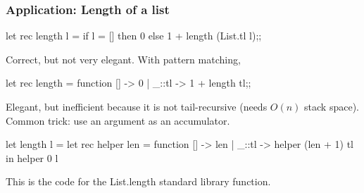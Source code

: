 \documentclass{plt}
\begin{document}
\begin{frame}[fragile]
  \frametitle{Application: Length of a list}

\begin{ocaml}
let rec length l =
  if l = [] then 0 else 1 + length (List.tl l);;
\end{ocaml}

Correct, but not very elegant.  With pattern matching,

\begin{ocaml}
let rec length = function
   []    -> 0
 | _::tl -> 1 + length tl;;
\end{ocaml}

Elegant, but inefficient because it is not tail-recursive (needs
$O(n)$ stack space).  Common trick: use an argument as an accumulator.

\begin{ocaml}
let length l =
  let rec helper len = function
      []    -> len
    | _::tl -> helper (len + 1) tl
  in helper 0 l
\end{ocaml}

This is the code for the List.length standard library function.

\end{frame}
\end{document}
